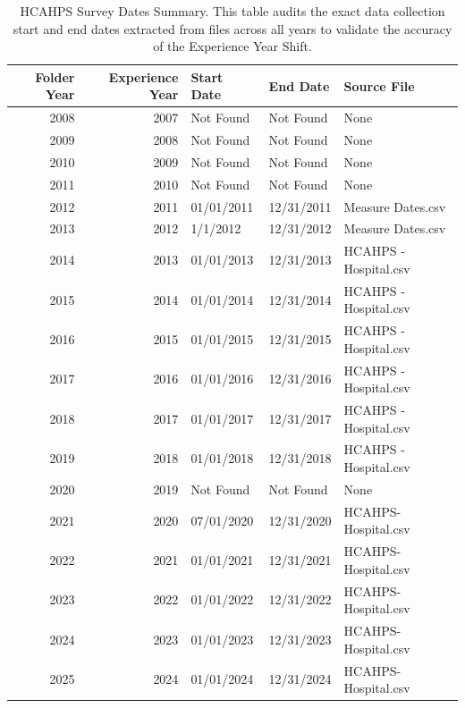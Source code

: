 \begin{table}[htbp]
\caption{HCAHPS Survey Dates Summary. This table audits the exact data collection start and end dates extracted from files across all years to validate the accuracy of the Experience Year Shift.}
\label{tab:survey_dates}
\begin{tabular}{rrlll}
\toprule
\rowcolor{gray!10}
Folder Year & Experience Year & Start Date & End Date & Source File \\
\midrule
2008 & 2007 & Not Found & Not Found & None \\
2009 & 2008 & Not Found & Not Found & None \\
2010 & 2009 & Not Found & Not Found & None \\
2011 & 2010 & Not Found & Not Found & None \\
2012 & 2011 & 01/01/2011 & 12/31/2011 & Measure Dates.csv \\
2013 & 2012 & 1/1/2012 & 12/31/2012 & Measure Dates.csv \\
2014 & 2013 & 01/01/2013 & 12/31/2013 & HCAHPS - Hospital.csv \\
2015 & 2014 & 01/01/2014 & 12/31/2014 & HCAHPS - Hospital.csv \\
2016 & 2015 & 01/01/2015 & 12/31/2015 & HCAHPS - Hospital.csv \\
2017 & 2016 & 01/01/2016 & 12/31/2016 & HCAHPS - Hospital.csv \\
2018 & 2017 & 01/01/2017 & 12/31/2017 & HCAHPS - Hospital.csv \\
2019 & 2018 & 01/01/2018 & 12/31/2018 & HCAHPS - Hospital.csv \\
2020 & 2019 & Not Found & Not Found & None \\
2021 & 2020 & 07/01/2020 & 12/31/2020 & HCAHPS-Hospital.csv \\
2022 & 2021 & 01/01/2021 & 12/31/2021 & HCAHPS-Hospital.csv \\
2023 & 2022 & 01/01/2022 & 12/31/2022 & HCAHPS-Hospital.csv \\
2024 & 2023 & 01/01/2023 & 12/31/2023 & HCAHPS-Hospital.csv \\
2025 & 2024 & 01/01/2024 & 12/31/2024 & HCAHPS-Hospital.csv \\
\bottomrule
\end{tabular}
\end{table}

